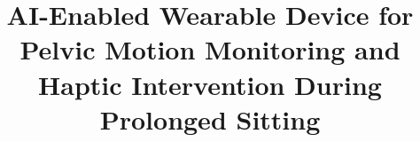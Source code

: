 \documentclass[11pt,a4paper,twocolumn]{report}
\title{AI-Enabled Wearable Device for Pelvic Motion Monitoring and Haptic Intervention During Prolonged Sitting}
\subtitle{}
\begin{document}
\preface


\FloatBarrier


\FloatBarrier

\FloatBarrier

\FloatBarrier





\appendix
\appendixpage


\backcover
\end{document}
